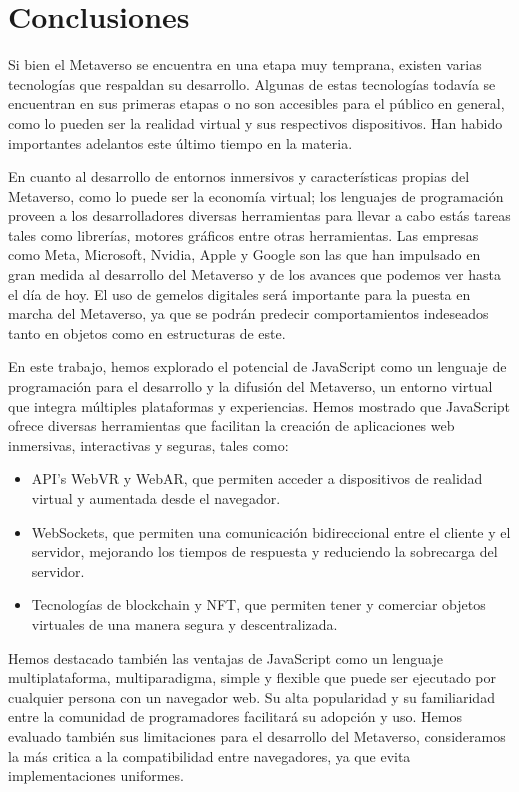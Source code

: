 \documentclass[a4paper,10pt]{article}
\begin{document}
\section{Conclusiones}
Si bien el Metaverso se encuentra en una etapa muy temprana, existen varias tecnologías que respaldan su desarrollo. Algunas de estas tecnologías todavía se encuentran en sus primeras etapas o no son accesibles para el público en general, como lo pueden ser la realidad virtual y sus respectivos dispositivos. Han habido importantes adelantos este último tiempo en la materia.\par
En cuanto al desarrollo de entornos inmersivos y características propias del Metaverso, como lo puede ser la economía virtual; los lenguajes de programación proveen a los desarrolladores diversas herramientas para llevar a cabo estás tareas tales como librerías, motores gráficos entre otras herramientas. Las empresas como Meta, Microsoft, Nvidia, Apple y Google son las que han impulsado en gran medida al desarrollo del Metaverso y de los avances que podemos ver hasta el día de hoy.
El uso de gemelos digitales será importante para la puesta en marcha del Metaverso, ya que se podrán predecir comportamientos indeseados tanto en objetos como en estructuras de este.\par
En este trabajo, hemos explorado el potencial de JavaScript como un lenguaje de programación para el desarrollo y la difusión del Metaverso, un entorno virtual que integra múltiples plataformas y experiencias. Hemos mostrado que JavaScript ofrece diversas herramientas que facilitan la creación de aplicaciones web inmersivas, interactivas y seguras, tales como:\par
\begin{itemize}
	\item API’s WebVR y WebAR, que permiten acceder a dispositivos de realidad virtual y aumentada desde el navegador.
	\item WebSockets, que permiten una comunicación bidireccional entre el cliente y el servidor, mejorando los tiempos de respuesta y reduciendo la sobrecarga del servidor.
	\item Tecnologías de blockchain y NFT, que permiten tener y comerciar objetos virtuales de una manera segura y descentralizada.
\end{itemize}
Hemos destacado también las ventajas de JavaScript como un lenguaje multiplataforma, multiparadigma, simple y flexible que puede ser ejecutado por cualquier persona con un navegador web. Su alta popularidad y su familiaridad entre la comunidad de programadores facilitará su adopción y uso. Hemos evaluado también sus limitaciones para el desarrollo del Metaverso, consideramos la más critica a la compatibilidad entre navegadores, ya que evita implementaciones uniformes.
\end{document}
